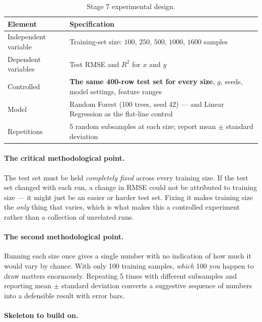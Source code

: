 \documentclass[11pt,a4paper]{article}
\newcommand{\Rsq}{R^{2}}
\begin{document}
\begin{table}[h]
\centering
\small
\caption{Stage 7 experimental design.}
\begin{tabular}{@{}lp{9.5cm}@{}}
\toprule
\textbf{Element} & \textbf{Specification} \\
\midrule
Independent variable & Training-set size: $100$, $250$, $500$, $1000$, $1600$ samples \\
Dependent variables  & Test RMSE and $\Rsq$ for $x$ and $y$ \\
Controlled           & \textbf{The same 400-row test set for every size}, $g$, seeds, model
                       settings, feature ranges \\
Model                & Random Forest (100 trees, seed 42) --- and Linear Regression as the
                       flat-line control \\
Repetitions          & 5 random subsamples at each size; report mean $\pm$ standard deviation \\
\bottomrule
\end{tabular}
\end{table}

\paragraph{The critical methodological point.}
The test set must be held \emph{completely fixed} across every training size. If the test set changed
with each run, a change in RMSE could not be attributed to training size --- it might just be an
easier or harder test set. Fixing it makes training size the \emph{only} thing that varies, which is
what makes this a controlled experiment rather than a collection of unrelated runs.

\paragraph{The second methodological point.}
Running each size once gives a single number with no indication of how much it would vary by chance.
With only 100 training samples, \emph{which} 100 you happen to draw matters enormously. Repeating
5 times with different subsamples and reporting mean $\pm$ standard deviation converts a suggestive
sequence of numbers into a defensible result with error bars.

\paragraph{Skeleton to build on.}
\end{document}
